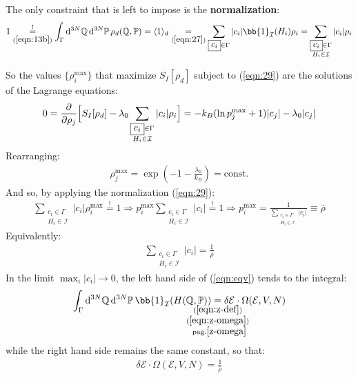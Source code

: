 \documentclass[../template.tex]{subfiles}
\begin{document}
The only constraint that is left to impose is the \textbf{normalization}: 
\begin{align}\label{eqn:29}
    1 \underset{(\ref{eqn:13b})}{\overset{!}{=} } \int_{\Gamma} \dd[3N]{\mathbb{Q}} \dd[3N]{\mathbb{P}} \rho_d(\mathbb{Q}, \mathbb{P}) = \langle 1 \rangle_d \underset{(\ref{eqn:27})}{=}  \sum_{\boxed{c_i} \in \Gamma} |c_i| \bb{1}_{\mathcal{I}} (H_i) \rho_i =\sum_{\substack{\boxed{c_i} \in \Gamma\\H_i \in \mathcal{I}}} |c_i| \rho_i
\end{align}

So the values $\{\rho_i^{\max}\}$ that maximize $S_I[\rho_d]$ subject to (\ref{eqn:29}) are the solutions of the Lagrange equations:
\begin{align*}
    0 = \pdv{\rho_j} \Big[S_I[\rho_d]- \lambda_0 \sum_{\substack{\boxed{c_i} \in \Gamma\\H_i \in \mathcal{I}}} |c_i| \rho_i\Big] = -k_B(\ln p_j^{\max} + 1) |c_j| - \lambda_0 |c_j|
\end{align*}
Rearranging:
\begin{align}\label{eqn:30}
    \rho_j^{\max} = \exp\left(-1-\frac{\lambda_0}{k_B} \right) = \text{const.}
\end{align}
And so, by applying the normalization (\ref{eqn:29}):
\begin{align*}
    \sum_{\substack{\boxed{c_i} \in \Gamma\\H_i \in \mathcal{I}}} |c_i| \rho_i^{\max} \overset{!}{=} 1 \Rightarrow p_i^{\max} \sum_{\substack{\boxed{c_i} \in \Gamma\\H_i \in \mathcal{I}}} |c_i| \overset{!}{=} 1 \Rightarrow p_i^{\max} = \frac{1}{\sum_{\substack{\boxed{c_i} \in \Gamma\\H_i \in \mathcal{I}}} |c_i|} \equiv \bar{\rho}
\end{align*}
Equivalently:
\begin{align}\label{eqn:eqv}
    \sum_{\substack{\boxed{c_i} \in \Gamma\\H_i \in \mathcal{I}}} |c_i| = \frac{1}{\bar{\rho}} 
\end{align}
In the limit $\max_i |c_i| \to 0$, the left hand side of (\ref{eqn:eqv}) tends to the integral:
\begin{align*}
    \int_{\Gamma} \dd[3N]{\mathbb{Q}} \dd[3N]{\mathbb{P}} \bb{1}_{\mathcal{I}}(H(\mathbb{Q}, \mathbb{P})) \underset{\mathclap{\substack{(\ref{eqn:z-def})\\
    (\ref{eqn:z-omega})\\\rm{\ pag.} \pageref{z-omega}}}
    }{=} \delta \mathcal{E}\cdot \Omega(\mathcal{E}, V, N)
\end{align*}
while the right hand side remains the same constant, so that:
\begin{align}\label{eqn:rho-omega}
    \delta \mathcal{E}\cdot \Omega(\mathcal{E}, V, N) = \frac{1}{\bar{\rho}} 
\end{align}
\end{document}
